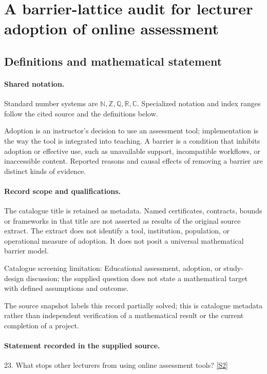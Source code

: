 \documentclass[11pt]{article}
\newcommand{\sref}[2]{\hyperlink{source:#1:#2}{[S#2]}}
\begin{document}
\section{A barrier-lattice audit for lecturer adoption of online assessment}\label{statement}

\subsection{Definitions and mathematical statement}

\paragraph{Shared notation.}Standard number systems are $\mathbb N,\mathbb Z,\mathbb Q,\mathbb R,\mathbb C$. Specialized notation and index ranges follow the cited source and the definitions below.


Adoption is an instructor's decision to use an assessment tool; implementation is the way the tool is integrated into teaching. A barrier is a condition that inhibits adoption or effective use, such as unavailable support, incompatible workflows, or inaccessible content. Reported reasons and causal effects of removing a barrier are distinct kinds of evidence.
\paragraph{Record scope and qualifications.}
The catalogue title is retained as metadata. Named certificates, contracts, bounds or frameworks in that title are not asserted as results of the original source extract.
The extract does not identify a tool, institution, population, or operational measure of adoption. It does not posit a universal mathematical barrier model.

Catalogue screening limitation: Educational assessment, adoption, or study-design discussion; the supplied question does not state a mathematical target with defined assumptions and outcome.

The source snapshot labels this record partially solved; this is catalogue metadata rather than independent verification of a mathematical result or the current completion of a project.
\paragraph{Statement recorded in the supplied source.}
23. What stops other lecturers from using online assessment tools? \sref{statement}{2}
\end{document}
